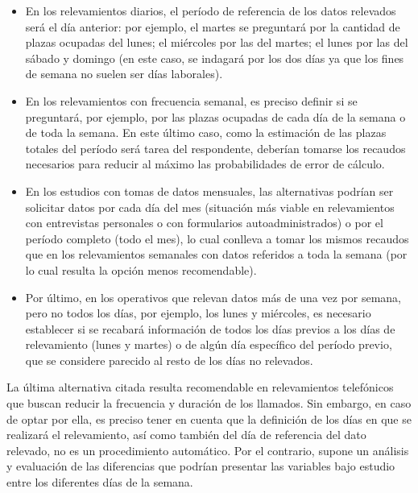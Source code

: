\documentclass[
]{book}
\begin{document}
\begin{itemize}
\item
  En los relevamientos diarios, el período de referencia de los datos relevados será el día anterior: por ejemplo, el martes se preguntará por la cantidad de plazas ocupadas del lunes; el miércoles por las del martes; el lunes por las del sábado y domingo (en este caso, se indagará por los dos días ya que los fines de semana no suelen ser días laborales).
\item
  En los relevamientos con frecuencia semanal, es preciso definir si se preguntará, por ejemplo, por las plazas ocupadas de cada día de la semana o de toda la semana. En este último caso, como la estimación de las plazas totales del período será tarea del respondente, deberían tomarse los recaudos necesarios para reducir al máximo las probabilidades de error de cálculo.
\item
  En los estudios con tomas de datos mensuales, las alternativas podrían ser solicitar datos por cada día del mes (situación más viable en relevamientos con entrevistas personales o con formularios autoadministrados) o por el período completo (todo el mes), lo cual conlleva a tomar los mismos recaudos que en los relevamientos semanales con datos referidos a toda la semana (por lo cual resulta la opción menos recomendable).
\item
  Por último, en los operativos que relevan datos más de una vez por semana, pero no todos los días, por ejemplo, los lunes y miércoles, es necesario establecer si se recabará información de todos los días previos a los días de relevamiento (lunes y martes) o de algún día específico del período previo, que se considere parecido al resto de los días no relevados.
\end{itemize}

La última alternativa citada resulta recomendable en relevamientos telefónicos que buscan reducir la frecuencia y duración de los llamados. Sin embargo, en caso de optar por ella, es preciso tener en cuenta que la definición de los días en que se realizará el relevamiento, así como también del día de referencia del dato relevado, no es un procedimiento automático. Por el contrario, supone un análisis y evaluación de las diferencias que podrían presentar las variables bajo estudio entre los diferentes días de la semana.
\end{document}
